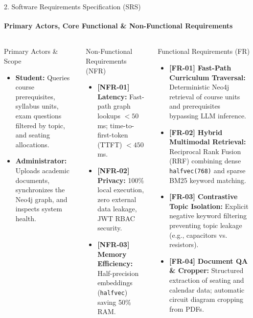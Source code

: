 \documentclass[aspectratio=169, 11pt]{beamer}
\begin{document}
\begin{frame}{2. Software Requirements Specification (SRS)}
    \framesubtitle{Primary Actors, Core Functional \& Non-Functional Requirements}
    \begin{columns}[T]
        \begin{block}{Primary Actors \& Scope}
            \footnotesize
            \begin{itemize}
                \item \textbf{Student:} Queries course prerequisites, syllabus units, exam questions filtered by topic, and seating allocations.
                \item \textbf{Administrator:} Uploads academic documents, synchronizes the Neo4j graph, and inspects system health.
            \end{itemize}
        \end{block}

        \begin{block}{Non-Functional Requirements (NFR)}
            \footnotesize
            \begin{itemize}
                \item \textbf{[NFR-01] Latency:} Fast-path graph lookups $<50$\,ms; time-to-first-token (TTFT) $<450$\,ms.
                \item \textbf{[NFR-02] Privacy:} 100\% local execution, zero external data leakage, JWT RBAC security.
                \item \textbf{[NFR-03] Memory Efficiency:} Half-precision embeddings (\texttt{halfvec}) saving 50\% RAM.
            \end{itemize}
        \end{block}

        \begin{block}{Functional Requirements (FR)}
            \footnotesize
            \begin{itemize}
                \item \textbf{[FR-01] Fast-Path Curriculum Traversal:} Deterministic Neo4j retrieval of course units and prerequisites bypassing LLM inference.
                \item \textbf{[FR-02] Hybrid Multimodal Retrieval:} Reciprocal Rank Fusion (RRF) combining dense \texttt{halfvec(768)} and sparse BM25 keyword matching.
                \item \textbf{[FR-03] Contrastive Topic Isolation:} Explicit negative keyword filtering preventing topic leakage (e.g., capacitors vs. resistors).
                \item \textbf{[FR-04] Document QA \& Cropper:} Structured extraction of seating and calendar data; automatic circuit diagram cropping from PDFs.
            \end{itemize}
        \end{block}
    \end{columns}
\end{frame}
\end{document}
